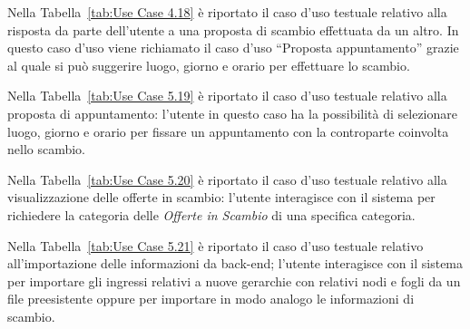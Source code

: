 Nella Tabella~\ref{tab:Use Case 4.18} è riportato il caso d'uso testuale relativo alla risposta da parte dell'utente a una proposta di scambio effettuata da un altro. In questo caso d'uso viene richiamato il caso d'uso ``Proposta appuntamento'' grazie al quale si può suggerire luogo, giorno e orario per effettuare lo scambio.\bigskip

Nella Tabella~\ref{tab:Use Case 5.19} è riportato il caso d'uso testuale relativo alla proposta di appuntamento: l'utente in questo caso ha la possibilità di selezionare luogo, giorno e orario per fissare un appuntamento con la controparte coinvolta nello scambio.\bigskip 

Nella Tabella~\ref{tab:Use Case 5.20} è riportato il caso d'uso testuale relativo alla visualizzazione delle offerte in scambio: l'utente interagisce con il sistema per richiedere la categoria delle \textit{Offerte in Scambio} di una specifica categoria.\bigskip

Nella Tabella~\ref{tab:Use Case 5.21} è riportato il caso d'uso testuale relativo all'importazione delle informazioni da back-end; l'utente interagisce con il sistema per importare gli ingressi relativi a nuove gerarchie con relativi nodi e fogli da un file preesistente oppure per importare in modo analogo le informazioni di scambio.\bigskip